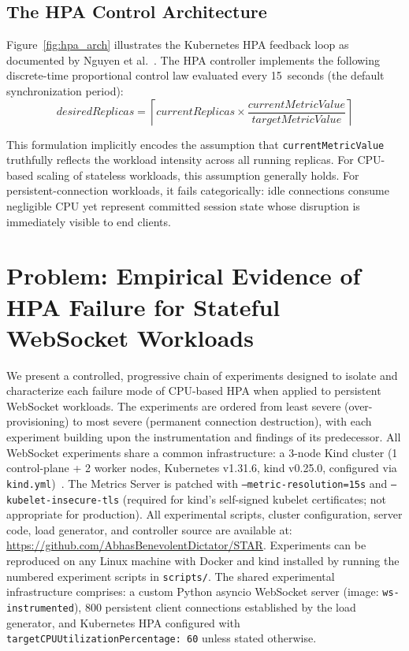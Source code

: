 \documentclass[twocolumn]{svjour3}
\begin{document}
\subsection{The HPA Control Architecture}

Figure~\ref{fig:hpa_arch} illustrates the Kubernetes HPA feedback loop as documented by Nguyen et al.~\cite{nguyen2020hpa}. The HPA controller implements the following discrete-time proportional control law evaluated every 15~seconds (the default synchronization period):
\begin{equation}
\textit{desiredReplicas} = \left\lceil \textit{currentReplicas} \times \frac{\textit{currentMetricValue}}{\textit{targetMetricValue}} \right\rceil
\label{eq:hpa}
\end{equation}

This formulation implicitly encodes the assumption that \texttt{currentMetricValue} truthfully reflects the workload intensity across all running replicas. For CPU-based scaling of stateless workloads, this assumption generally holds. For persistent-connection workloads, it fails categorically: idle connections consume negligible CPU yet represent committed session state whose disruption is immediately visible to end clients.


\section{Problem: Empirical Evidence of HPA Failure for Stateful WebSocket Workloads}
\label{sec:problem}

We present a controlled, progressive chain of experiments designed to isolate and characterize each failure mode of CPU-based HPA when applied to persistent WebSocket workloads. The experiments are ordered from least severe (over-provisioning) to most severe (permanent connection destruction), with each experiment building upon the instrumentation and findings of its predecessor. All WebSocket experiments share a common infrastructure: a 3-node Kind cluster (1 control-plane + 2 worker nodes, Kubernetes v1.31.6, kind v0.25.0, configured via \texttt{kind.yml})~\cite{kind_docs}. The Metrics Server is patched with \texttt{--metric-resolution=15s} and \texttt{--kubelet-insecure-tls} (required for kind's self-signed kubelet certificates; not appropriate for production). All experimental scripts, cluster configuration, server code, load generator, and controller source are available at: \url{https://github.com/AbhasBenevolentDictator/STAR}. Experiments can be reproduced on any Linux machine with Docker and kind installed by running the numbered experiment scripts in \texttt{scripts/}. The shared experimental infrastructure comprises: a custom Python asyncio WebSocket server (image: \texttt{ws-instrumented}), 800 persistent client connections established by the load generator, and Kubernetes HPA configured with \texttt{targetCPUUtilizationPercentage: 60} unless stated otherwise.
\end{document}
